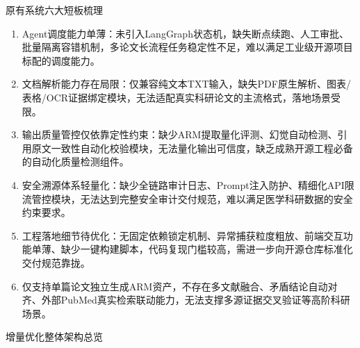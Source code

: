 ﻿\documentclass[UTF8,aspectratio=169]{ctexbeamer}
\begin{document}
\begin{frame}{原有系统六大短板梳理}
  \begin{enumerate}
    \item Agent调度能力单薄：未引入LangGraph状态机，缺失断点续跑、人工审批、批量隔离容错机制，多论文长流程任务稳定性不足，难以满足工业级开源项目标配的调度能力。
    \item 文档解析能力存在局限：仅兼容纯文本TXT输入，缺失PDF原生解析、图表/表格/OCR证据绑定模块，无法适配真实科研论文的主流格式，落地场景受限。
    \item 输出质量管控仅依靠定性约束：缺少ARM提取量化评测、幻觉自动检测、引用原文一致性自动化校验模块，无法量化输出可信度，缺乏成熟开源工程必备的自动化质量检测组件。
    \item 安全溯源体系轻量化：缺少全链路审计日志、Prompt注入防护、精细化API限流管控模块，无法达到完整安全审计交付规范，难以满足医学科研数据的安全约束要求。
    \item 工程落地细节待优化：无固定依赖锁定机制、异常捕获粒度粗放、前端交互功能单薄、缺少一键构建脚本，代码复现门槛较高，需进一步向开源仓库标准化交付规范靠拢。
    \item 仅支持单篇论文独立生成ARM资产，不存在多文献融合、矛盾结论自动对齐、外部PubMed真实检索联动能力，无法支撑多源证据交叉验证等高阶科研场景。
  \end{enumerate}
\end{frame}

\begin{frame}{增量优化整体架构总览}
  \begin{center}
  \end{center}
\end{frame}
\end{document}
